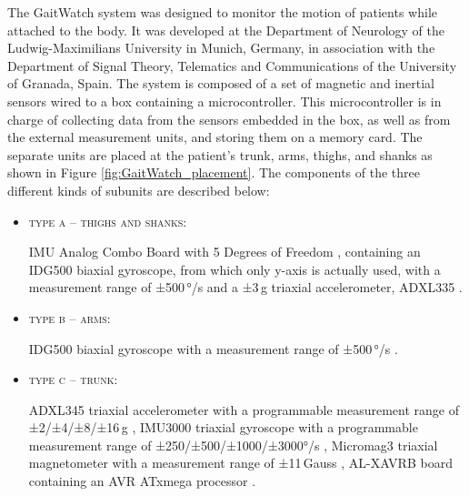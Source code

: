 The GaitWatch system was designed to monitor the motion of patients while attached to the body. It was developed at the Department of Neurology of the Ludwig-Maximilians University in Munich, Germany, in association with the Department of Signal Theory, Telematics and Communications of the University of Granada, Spain. The system is composed of a set of magnetic and inertial sensors wired to a box containing a microcontroller. This microcontroller is in charge of collecting data from the sensors embedded in the box, as well as from the external measurement units, and storing them on a memory card. The separate units are placed at the patient's trunk, arms, thighs, and shanks as shown in Figure \ref{fig:GaitWatch_placement}. The components of the three different kinds of subunits are described below:

\begin{itemize}

\item \textsc{type a -- thighs and shanks:} 

IMU Analog Combo Board with 5 Degrees of Freedom \cite{IMU5}, containing an IDG500 biaxial gyroscope, from which only y-axis is actually used, with a measurement range of ±500\,°/s \cite{IDG500} and a ±3\,g triaxial accelerometer, ADXL335 \cite{ADXL335}.

\item \textsc{type b -- arms:}

IDG500 biaxial gyroscope with a measurement range of ±500\,°/s \cite{IDG500}.

\item \textsc{type c -- trunk:}

ADXL345 triaxial accelerometer with a programmable measurement range of ±2/±4/±8/±16\,g \cite{ADXL345},
IMU3000 triaxial gyroscope with a programmable measurement range of ±250/±500/±1000/±3000°/s \cite{IMU3000}, 
Micromag3 \allowbreak triaxial magnetometer with a measurement range of ±11\,Gauss \cite{MicroMag3}, AL-XAVRB board containing an AVR ATxmega processor \cite{AVRATxmega}.

\end{itemize}

